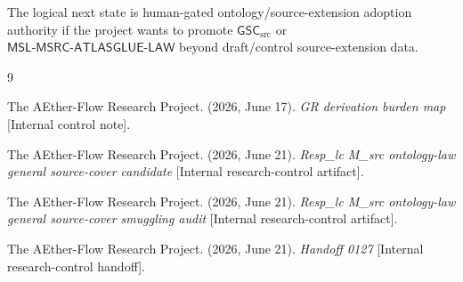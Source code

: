 \documentclass[11pt]{article}
\newcommand{\MSL}{\mathsf{MSL}\mbox{-}\mathsf{MSRC}\mbox{-}\mathsf{ATLASGLUE}\mbox{-}\mathsf{LAW}}
\newcommand{\GSC}{\mathsf{GSC}_{\mathrm{src}}}
\begin{document}
The logical next state is human-gated ontology/source-extension adoption
authority if the project wants to promote \(\GSC\) or \(\MSL\) beyond
draft/control source-extension data.

\begin{thebibliography}{9}

The AEther-Flow Research Project. (2026, June 17). \emph{GR derivation burden
map} [Internal control note].

The AEther-Flow Research Project. (2026, June 21). \emph{Resp\_lc M\_src
ontology-law general source-cover candidate} [Internal research-control
artifact].

The AEther-Flow Research Project. (2026, June 21). \emph{Resp\_lc M\_src
ontology-law general source-cover smuggling audit} [Internal research-control
artifact].

The AEther-Flow Research Project. (2026, June 21). \emph{Handoff 0127}
[Internal research-control handoff].

\end{thebibliography}
\end{document}
